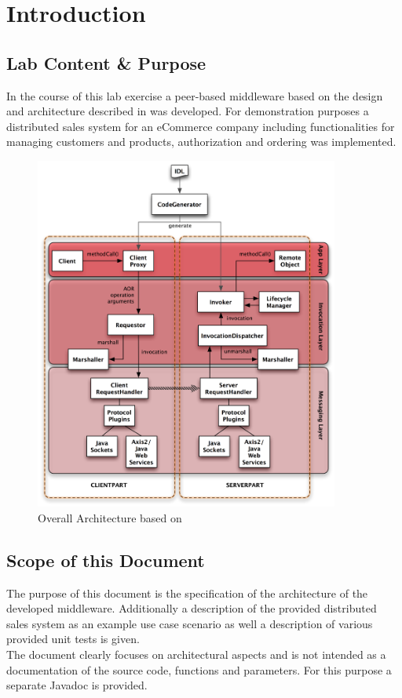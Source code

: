 \documentclass[a4paper]{article}
\begin{document}
\section{Introduction}
\subsection{Lab Content \& Purpose}

In the course of this lab exercise a peer-based middleware based on the design and architecture described in \cite{zdun2008} was developed. For demonstration purposes a distributed sales system for an eCommerce company including functionalities for managing customers and products, authorization and ordering was implemented.

\begin{figure}[ht!]
	\centering\includegraphics[width=10cm]{architektur.png} 
	\caption{Overall Architecture based on \cite{zdun2008}}
	\label{fig:architecture}
\end{figure}

\subsection{Scope of this Document}
The purpose of this document is the specification of the architecture of the developed middleware. Additionally a description of the provided distributed sales system as an example use case scenario as well a description of various provided unit tests is given. \\The document clearly focuses on architectural aspects and is not intended as a documentation of the source code, functions and parameters. For this purpose a separate Javadoc is provided.
\end{document}
